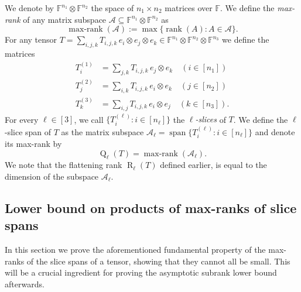 \documentclass{daj}
\DeclareMathOperator{\subrank}{Q}
\DeclareMathOperator{\tensorrank}{R}
\newcommand{\FF}{\mathbb{F}}
\DeclareMathOperator{\linspan}{span}
\DeclareMathOperator{\rank}{rank} \DeclareMathOperator{\col}{colspan}
\DeclareMathOperator{\maxrank}{max-rank}
\begin{document}
%
    We denote by $\FF^{n_1} \otimes \FF^{n_2}$ the space of $n_1 \times n_2$ matrices over $\FF$.
    We define the \emph{max-rank} of any matrix subspace $\mathcal{A} \subseteq \FF^{n_1} \otimes \FF^{n_2}$ as
    \[
\maxrank(\mathcal{A}):=\max\{\rank(A):A\in\mathcal{A}\}.
    \]
%
%
For any tensor $T = \sum_{i,j,k} T_{i,j,k}\, e_i \otimes e_j \otimes e_k \in \FF^{n_1} \otimes \FF^{n_2} \otimes \FF^{n_3}$ we define the matrices %
%
%
%
%
%
%
\begin{align*}
T^{(1)}_i &= \sum_{j,k} T_{i,j,k}\, e_j \otimes e_k \quad (i \in [n_1])\\
T^{(2)}_j &= \sum_{i,k} T_{i,j,k}\, e_i \otimes e_k \quad (j \in [n_2])\\
T^{(3)}_k &= \sum_{i,j} T_{i,j,k}\, e_i \otimes e_j \quad (k \in [n_3]).
\end{align*}
For every $\ell \in [3]$, we call $\{T^{(\ell)}_i : i \in [n_\ell] \}$ the \emph{$\ell$-slices} of $T$. %
%
%
%
%
%
%
%
%
%
%
%
%
%
%
%
%
%
%
%
%
%
%
%
%
%
%
%
%
%
%
%
%
%
%
%
%
%
%
%
%
%
%
We define the $\ell$-slice span of $T$ as the matrix subspace
$\mathcal{A}_\ell = \linspan \{T^{(\ell)}_i : i \in [n_\ell] \}$
and denote its max-rank by
\[
\subrank_\ell(T) = \maxrank(\mathcal{A}_\ell).
\]
%
%
We note that the flattening rank $\tensorrank_\ell(T)$ defined earlier, is equal to the dimension of the subspace $\mathcal{A}_\ell$. 

%



%
%



%
%

%
%
%
%
%
%
%
%

%
%
%

%
%
%
%
%
%
%
%
%
%
%
%
%
%
%
%

%

%
%
%
%
%
%
%
%
%
%
%
%
%




\subsection{Lower bound on products of max-ranks of slice spans}\label{subsec:QiQj}

%

%

%

%

In this section we prove the aforementioned fundamental property of the max-ranks of the slice spans of a tensor, showing that they cannot all be small. This will be a crucial ingredient for proving the asymptotic subrank lower bound afterwards.
\end{document}
